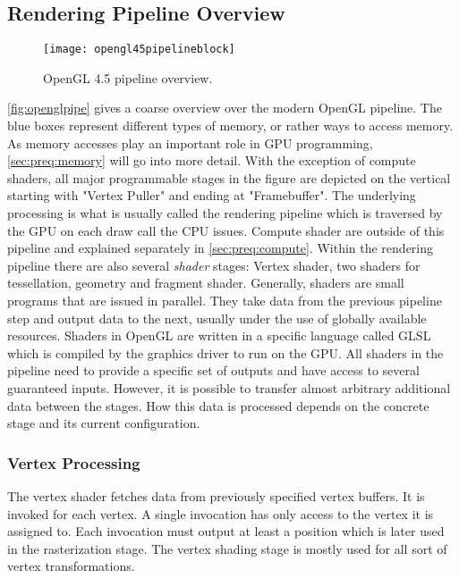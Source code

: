 \documentclass[thesis.tex]{subfiles}
\begin{document}
\subsection{Rendering Pipeline Overview}
\begin{figure}[h]
\centering
\texttt{[image: opengl45pipelineblock]}
\caption{\cite{bib:openglspec} OpenGL 4.5 pipeline overview.}
\label{fig:openglpipe}
\end{figure}
\autoref{fig:openglpipe} gives a coarse overview over the modern OpenGL pipeline.
The blue boxes represent different types of memory, or rather ways to access memory.
As memory accesses play an important role in GPU programming, \autoref{sec:preq:memory} will go into more detail.
With the exception of compute shaders, all major programmable stages in the figure are depicted on the vertical starting with "Vertex Puller" and ending at "Framebuffer".
The underlying processing is what is usually called the rendering pipeline which is traversed by the GPU on each draw call the CPU issues.
Compute shader are outside of this pipeline and explained separately in \autoref{sec:preq:compute}.
Within the rendering pipeline there are also several \emph{shader} stages: Vertex shader, two shaders for tessellation, geometry and fragment shader.
Generally, shaders are small programs that are issued in parallel.
They take data from the previous pipeline step and output data to the next, usually under the use of globally available resources.
Shaders in OpenGL are written in a specific language called GLSL which is compiled by the graphics driver to run on the GPU.
All shaders in the pipeline need to provide a specific set of outputs and have access to several guaranteed inputs.
However, it is possible to transfer almost arbitrary additional data between the stages.
How this data is processed depends on the concrete stage and its current configuration.

\subsubsection{Vertex Processing}
The vertex shader fetches data from previously specified vertex buffers.
It is invoked for each vertex.
A single invocation has only access to the vertex it is assigned to.
Each invocation must output at least a position which is later used in the rasterization stage.
The vertex shading stage is mostly used for all sort of vertex transformations.
\end{document}
